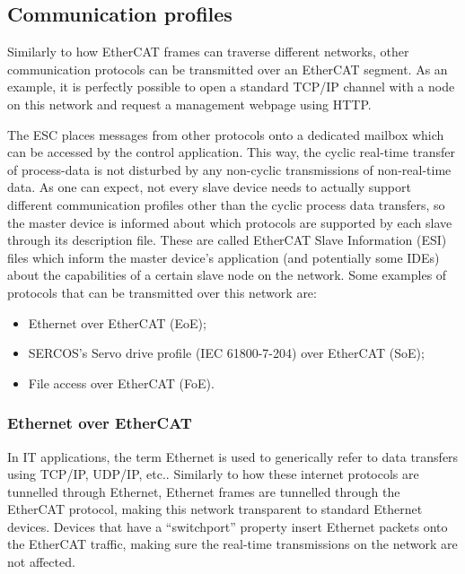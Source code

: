 \subsection{Communication profiles} \label{subsec:comm_profiles}

Similarly to how EtherCAT frames can traverse different networks, other communication protocols can be transmitted over an EtherCAT segment.
As an example, it is perfectly possible to open a standard TCP/IP channel with a node on this network and request a management webpage using HTTP.

The ESC places messages from other protocols onto a dedicated mailbox which can be accessed by the control application.
This way, the cyclic real-time transfer of process-data is not disturbed by any non-cyclic transmissions of non-real-time data.
As one can expect, not every slave device needs to actually support different communication profiles other than the cyclic process data transfers, so the master device is informed about which protocols are supported by each slave through its description file.
These are called EtherCAT Slave Information (ESI) files which inform the master device's application (and potentially some IDEs) about the capabilities of a certain slave node on the network.
Some examples of protocols that can be transmitted over this network are:

\begin{itemize}
	\item Ethernet over EtherCAT (EoE);
	\item SERCOS's \texttrademark{} Servo drive profile (IEC 61800-7-204) over EtherCAT (SoE);
	\item File access over EtherCAT (FoE).
\end{itemize}

\subsubsection*{Ethernet over EtherCAT}

In IT applications, the term Ethernet is used to generically refer to data transfers using TCP/IP, UDP/IP, etc..
Similarly to how these internet protocols  are tunnelled through Ethernet, Ethernet frames are tunnelled through the EtherCAT protocol, making this network transparent to standard Ethernet devices.
Devices that have a ``switchport'' property insert Ethernet packets onto the EtherCAT traffic, making sure the real-time transmissions on the network are not affected.

